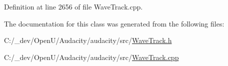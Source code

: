 Definition at line 2656 of file Wave\+Track.\+cpp.



The documentation for this class was generated from the following files\+:\begin{DoxyCompactItemize}
\item 
C\+:/\+\_\+dev/\+Open\+U/\+Audacity/audacity/src/\hyperlink{_wave_track_8h}{Wave\+Track.\+h}\item 
C\+:/\+\_\+dev/\+Open\+U/\+Audacity/audacity/src/\hyperlink{_wave_track_8cpp}{Wave\+Track.\+cpp}\end{DoxyCompactItemize}
